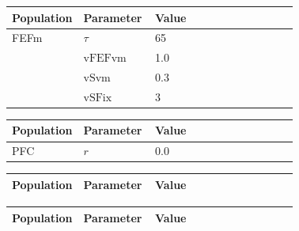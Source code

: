 \documentclass{article}
\begin{document}
\vspace{2ex}

\noindent
\begin{tabularx}{\linewidth}{|p{0.25\linewidth}|p{0.25\linewidth}|X|}\hline
\textbf{Population} & \textbf{Parameter} & \textbf{Value}   \\ \hline

    FEFm             & $\tau$        & 65  \\ \hline

                 & ${\text{vFEFvm}}$        & 1.0  \\ \hline

                 & ${\text{vSvm}}$        & 0.3  \\ \hline

                 & ${\text{vSFix}}$        & 3  \\ \hline

\end{tabularx}

\vspace{2ex}

\noindent
\begin{tabularx}{\linewidth}{|p{0.25\linewidth}|p{0.25\linewidth}|X|}\hline
\textbf{Population} & \textbf{Parameter} & \textbf{Value}   \\ \hline

    PFC             & $r$        & 0.0  \\ \hline

\end{tabularx}

\vspace{2ex}

\noindent
\begin{tabularx}{\linewidth}{|p{0.25\linewidth}|p{0.25\linewidth}|X|}\hline
\textbf{Population} & \textbf{Parameter} & \textbf{Value}   \\ \hline

\end{tabularx}

\vspace{2ex}

\noindent
\begin{tabularx}{\linewidth}{|p{0.25\linewidth}|p{0.25\linewidth}|X|}\hline
\textbf{Population} & \textbf{Parameter} & \textbf{Value}   \\ \hline

\end{tabularx}

\vspace{2ex}
\end{document}
